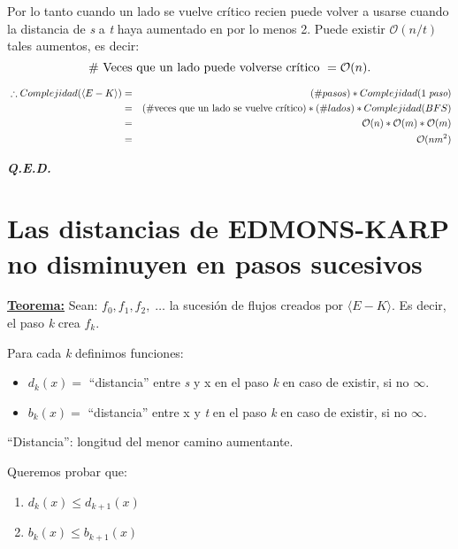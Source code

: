 \documentclass[12pt,a4paper]{report}
\newcommand{\QED}{\hfill \textit{\textbf{Q.E.D.}}}
\begin{document}
			\vspace{5mm}
			\par Por lo tanto cuando un lado se vuelve crítico recien puede volver a usarse cuando la distancia de \textit{s} a \textit{t} haya aumentado en por lo menos 2. Puede existir $\mathcal{O}(n/t)$ tales aumentos, es decir:
				\[ \# \textup{ Veces que un lado puede volverse crítico } = \mathcal{O}(n). \]

			\begin{eqnarray}
				\nonumber \; \therefore Complejidad(\langle E-K\rangle) &=& (\# pasos) * Complejidad(1 \; \textit{paso}) \\
				\nonumber &=& (\# \textup{veces que un lado se vuelve crítico}) * (\# lados) * Complejidad(BFS) \\
				\nonumber  &=& \mathcal{O}(n) * \mathcal{O}(m)* \mathcal{O}(m) \\
				\nonumber &=& \mathcal{O}(nm^{2})
			\end{eqnarray}

		\QED

	\pagebreak
	\section{Las distancias de EDMONS-KARP no disminuyen en pasos sucesivos}
		\textbf{\underline{Teorema:}} Sean: $f_{0}, f_{1}, f_{2}, \; \dotsc$ \; la sucesión de flujos creados por $\langle E-K\rangle$. Es decir, el paso \textit{k} crea $f_{k}$.

			\vspace{5mm}
			\par Para cada \textit{k} definimos funciones:

			\begin{itemize}
				\item $d_{k}(x) =$ \textquotedblleft distancia\textquotedblright \; entre \textit{s} y x en el paso \textit{k} en caso de existir, si no $\infty$.
				\item $b_{k}(x) =$ \textquotedblleft distancia\textquotedblright \; entre x y \textit{t} en el paso \textit{k} en caso de existir, si no $\infty$.
			\end{itemize}

			\textquotedblleft Distancia\textquotedblright: longitud del menor camino aumentante.

			\vspace{5mm}
			\par Queremos probar que:
			\begin{enumerate}
				\item $d_{k}(x) \leq d_{k + 1}(x)$
				\item $b_{k}(x) \leq b_{k + 1}(x)$
			\end{enumerate}
\end{document}
